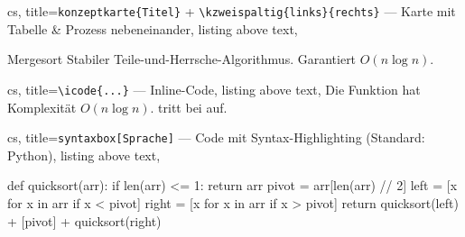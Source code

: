 \documentclass[a4paper, 11pt, ngerman]{article}
\begin{document}
\vspace{0.45em}

\begin{tcblisting}{cs,
  title={\texttt{konzeptkarte\{Titel\}} + \texttt{\textbackslash kzweispaltig\{links\}\{rechts\}} — Karte mit Tabelle \& Prozess nebeneinander},
  listing above text,
}
\begin{konzeptkarte}{Mergesort}
  Stabiler Teile-und-Herrsche-Algorithmus. Garantiert $O(n \log n)$.
\end{konzeptkarte}
\end{tcblisting}

\vspace{0.45em}

\noindent
\begin{minipage}[t]{0.36\linewidth}
\begin{tcblisting}{cs,
  title={\texttt{\textbackslash icode\{...\}} — Inline-Code},
  listing above text,
}
Die Funktion 
hat Komplexität $O(n \log n)$.
tritt bei 
auf.
\end{tcblisting}
\end{minipage}%
\hfill
\begin{minipage}[t]{0.61\linewidth}
\begin{tcblisting}{cs,
  title={\texttt{syntaxbox[Sprache]} — Code mit Syntax-Highlighting (Standard: Python)},
  listing above text,
}
\begin{syntaxbox}[Python]
def quicksort(arr):
    if len(arr) <= 1:
        return arr
    pivot = arr[len(arr) // 2]
    left  = [x for x in arr if x < pivot]
    right = [x for x in arr if x > pivot]
    return quicksort(left) + [pivot] + quicksort(right)
\end{syntaxbox}
\end{tcblisting}
\end{minipage}
\end{document}
